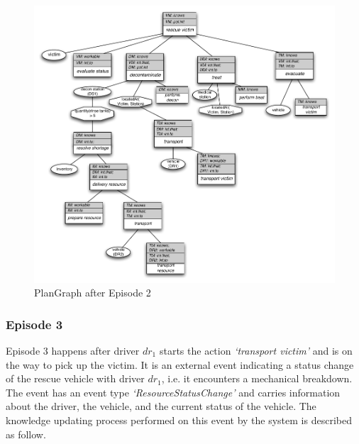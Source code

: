 \begin{figure}[htbp] %
	\centering
	\includegraphics[width=5.8in]{plangraph_ep2.pdf} 
	\caption{PlanGraph after Episode 2}
	\label{fig:plangraph_ep2}
\end{figure}

\subsubsection{Episode 3} %
\label{ssub:episode_3}
Episode 3 happens after driver $dr_1$ starts the action \emph{`transport victim'} and is on the way to pick up the victim. It is an external event indicating a status change of the rescue vehicle with driver $dr_1$, i.e. it encounters a mechanical breakdown. The event has an event type \emph{`ResourceStatusChange'} and carries information about the driver, the vehicle, and the current status of the vehicle. The knowledge updating process performed on this event by the system is described as follow.

